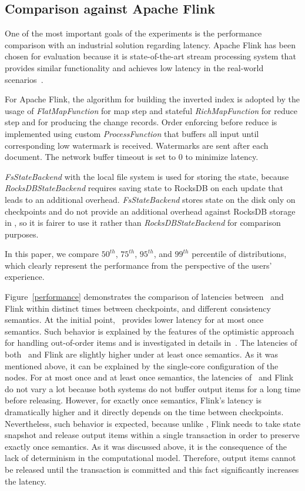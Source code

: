 \subsection{Comparison against Apache Flink}
One of the most important goals of the experiments is the performance comparison with an industrial solution regarding latency. Apache Flink has been chosen for evaluation because it is state-of-the-art stream processing system that provides similar functionality and achieves low latency in the real-world scenarios~\cite{S7530084}. 

For Apache Flink, the algorithm for building the inverted index is adopted by the usage of {\it FlatMapFunction} for map step and stateful {\it RichMapFunction} for reduce step and for producing the change records. Order enforcing before reduce is implemented using custom {\it ProcessFunction} that buffers all input until corresponding low watermark is received. Watermarks are sent after each document. The network buffer timeout is set to 0 to minimize latency.

{\it FsStateBackend} with the local file system is used for storing the state, because {\it RocksDBStateBackend} requires saving state to RocksDB on each update that leads to an additional overhead. {\it FsStateBackend} stores state on the disk only on checkpoints and do not provide an additional overhead against RocksDB storage in \FlameStream, so it is fairer to use it rather than {\it RocksDBStateBackend} for comparison purposes.

In this paper, we compare $50^{th}$, $75^{th}$, $95^{th}$, and $99^{th}$ percentile of distributions, which clearly represent the performance from the perspective of the users' experience.

Figure~\ref{performance} demonstrates the comparison of latencies between \FlameStream\ and Flink within distinct times between checkpoints, and different consistency semantics. At the initial point, \FlameStream\ provides lower latency for at most once semantics. Such behavior is explained by the features of the optimistic approach for handling out-of-order items and is investigated in details in~\cite{we2018seim}. The latencies of both \FlameStream\ and Flink are slightly higher under at least once semantics. As it was mentioned above, it can be explained by the single-core configuration of the nodes. For at most once and at least once semantics, the latencies of \FlameStream\ and Flink do not vary a lot because both systems do not buffer output items for a long time before releasing. However, for exactly once semantics, Flink's latency is dramatically higher and it directly depends on the time between checkpoints. Nevertheless, such behavior is expected, because unlike \FlameStream, Flink needs to take state snapshot and release output items within a single transaction in order to preserve exactly once semantics. As it was discussed above, it is the consequence of the lack of determinism in the computational model. Therefore, output items cannot be released until the transaction is committed and this fact significantly increases the latency. 

